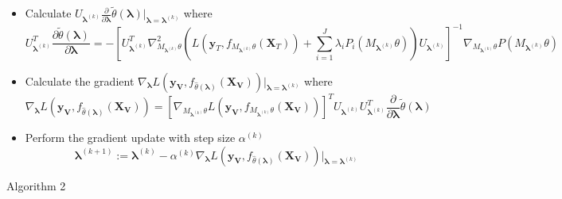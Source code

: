 \documentclass[10pt,letterpaper]{article}
\begin{document}
\begin{center}
{{\begin{itemize}
              \item[] Calculate $U_{\boldsymbol{\lambda}^{(k)}} \frac{\partial}{\partial \boldsymbol \lambda} \tilde{\theta}(\boldsymbol{\lambda})|_{\boldsymbol{\lambda} = \boldsymbol{\lambda}^{(k)}}$ where
              \begin{equation}
	      U_{\boldsymbol{\lambda}^{(k)}}^T
	      \frac{\partial \tilde{\theta}(\boldsymbol{\lambda})}{\partial \boldsymbol \lambda} 
		= - \left [
		U_{\boldsymbol \lambda^{(k)}}^T
		\nabla_{M_{\boldsymbol \lambda^{(k)}} \theta}^2 \left (
			 L(\boldsymbol{y}_T, f_{M_{\boldsymbol \lambda^{(k)}} \theta} (\boldsymbol{X}_T))  + 
			 \sum\limits_{i=1}^J \lambda_i P_i(M_{\boldsymbol \lambda^{(k)}} \theta)
		\right ) U_{\boldsymbol \lambda^{(k)}}
		\right ]^{-1}
		\nabla_{M_{\boldsymbol \lambda^{(k)}} \theta} P(M_{\boldsymbol \lambda^{(k)}} \theta)
              \end{equation}
              
              \item[] Calculate the gradient $\nabla_{\boldsymbol{\lambda}} L(\boldsymbol{y_V}, f_{\hat \theta(\boldsymbol{\lambda})}(\boldsymbol{X_V})) |_{\boldsymbol{\lambda} = \boldsymbol{\lambda}^{(k)}}$ where
              \begin{equation}
              \nabla_{\boldsymbol{\lambda}} L(\boldsymbol{y_V}, f_{\hat \theta(\boldsymbol{\lambda})}(\boldsymbol{X_V})) =
              \left [
              	\nabla_{M_{\boldsymbol \lambda^{(k)}} \theta} L(\boldsymbol{y_V}, f_{M_{\boldsymbol \lambda^{(k)}} \theta}(\boldsymbol{X_V}))
              \right ]^T
              U_{\boldsymbol{\lambda}^{(k)}} U_{\boldsymbol{\lambda}^{(k)}}^T
              \frac{\partial}{\partial \boldsymbol \lambda} \tilde{\theta}(\boldsymbol{\lambda})
	     \label{gradientCalculation}
              \end{equation}
              
              \item[] Perform the gradient update with step size $\alpha^{(k)}$
	\begin{equation*}
	\boldsymbol{\lambda}^{(k+1)} := \boldsymbol{\lambda}^{(k)} - \alpha^{(k)} \nabla_{\boldsymbol{\lambda}} L(\boldsymbol{y_V}, f_{\hat \theta(\boldsymbol{\lambda})}(\boldsymbol{X_V})) |_{\boldsymbol{\lambda} = \boldsymbol{\lambda}^{(k)}}
	\end{equation*}
         \end{itemize}
    }
  }
  Algorithm 2
\end{center}
\end{document}
